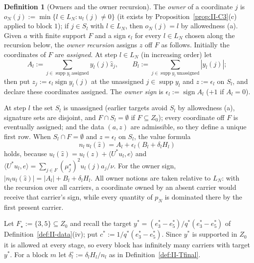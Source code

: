 \documentclass[10pt]{amsart}
\theoremstyle{definition}
\newtheorem{definition}[theorem]{Definition}
\theoremstyle{remark}
\newcommand{\supp}{\operatorname{supp}}
\newcommand{\sgn}{\operatorname{sign}}
\newcommand{\zh}{\hat z}
\newcommand{\ip}[2]{\langle #1,#2\rangle}
\begin{document}
\begin{definition}[Owners and the owner recursion]\label{def:II-owner}
The \emph{owner} of a coordinate $j$ is $o_N(j):=\min\{l\in L_N:u_l(j)\ne0\}$
(it exists by Proposition~\ref{prop:II-C3}(c) applied to block $1$); if $j\in
S_l$ with $l\in L_N$, then $o_N(j)=l$ by allowedness (a).  Given $a$ with
finite support $F$ and a sign $\epsilon_l$ for every $l\in L_N$ chosen
along the recursion below, the \emph{owner recursion} assigns $z$ off $F$
as follows.  Initially the coordinates of $F$ are \emph{assigned}.  At step
$l\in L_N$ (in increasing order) let
\[
 A_l:=\sum_{j\in\supp y_l\ \text{assigned}}y_l(j)\zh_j,\qquad
 B_l:=\sum_{j\in\supp y_l\ \text{unassigned}}|y_l(j)| ;
\]
then put $z_j:=\epsilon_l\sgn y_l(j)$ at the unassigned $j\in\supp y_l$ and
$z:=\epsilon_l$ on $S_l$, and declare these coordinates assigned.  The
\emph{owner sign} is $\epsilon_l:=\sgn A_l$ ($+1$ if $A_l=0$).
\end{definition}

At step $l$ the set $S_l$ is unassigned (earlier targets avoid $S_l$ by
allowedness (a), signature sets are disjoint, and $F\cap S_l=\emptyset$ if
$F\subseteq Z_0$); every coordinate off $F$ is eventually assigned; and the
data $(a,z)$ are admissible, so they define a unique first row.  When
$S_l\cap F=\emptyset$ and $z=\epsilon_l$ on $S_l$, the value formula
\begin{equation}\label{eq:II-valueformula}
 n_l\,u_l(\zh)=A_l+\epsilon_l(B_l+\delta_lH_l)
\end{equation}
holds, because $u_l(\zh)=u_l(z)+\ip{U^*u_l}{e}$ and $\ip{U^*u_l}{e}=\sum_{j\in
F}(\mu^\star_j)^2u_l(j)a_j/\nu$.  For the owner sign, $|n_lu_l(\zh)|=|A_l|+B_l+
\delta_lH_l$.  All owner notions are taken relative to $L_N$: with the
recursion over all carriers, a coordinate owned by an absent carrier would
receive that carrier's sign, while every quantity of $p_N$ is dominated
there by the first present carrier.

\smallskip
Let $F_\star:=\{3,5\}\subseteq Z_0$ and recall the target $y^*=(e_3^*-e_5^*)/
q^*(e_3^*-e_5^*)$ of Definition~\ref{def:II-data}(iv); put $c^*:=1/q^*(e_3^*-
e_5^*)$.  Since $y^*$ is supported in $Z_0$ it is allowed at every stage, so
every block has infinitely many carriers with target $y^*$.  For a block $m$
let $\delta^\circ_l:=\delta_lH_l/n_l$ as in Definition~\ref{def:II-Tfinal}.
\end{document}
